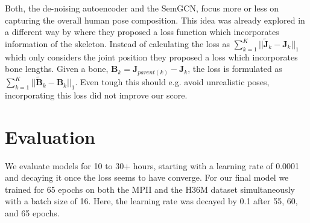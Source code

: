 
Both, the de-noising autoencoder and the SemGCN, focus more or less on capturing the overall human pose composition.
This idea was already explored in a different way by \citeauthor{sun_compositional_2017} \cite{sun_compositional_2017}
where they proposed a loss function which incorporates information of the skeleton.
Instead of calculating the loss as $\sum_{k=1}^K ||\tilde{\mathbf{J}}_k-\mathbf{J}_k||_1$ which only considers the joint position they proposed a loss which incorporates bone lengths.
Given a bone, $\mathbf{B}_k=\mathbf{J}_{parent(k)}-\mathbf{J}_k$, the loss is formulated as $\sum_{k=1}^K ||\tilde{\mathbf{B}}_k-\mathbf{B}_k||_1$.
Even tough this should e.g. avoid unrealistic poses, incorporating this loss did not improve our score.


\section{Evaluation}
We evaluate models for 10 to 30+ hours, starting with a learning rate of 0.0001 and decaying it once the loss seems to have converge.
For our final model we trained for 65 epochs on both the MPII and the H36M dataset simultaneously with a batch size of 16. Here, the learning rate was decayed by 0.1 after 55, 60, and 65 epochs.



